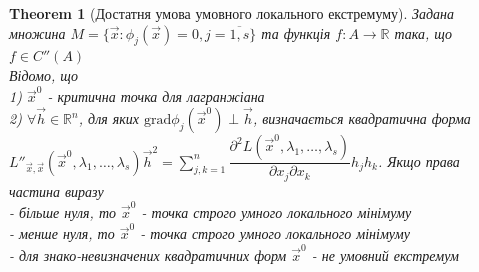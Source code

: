 \documentclass[a4paper, 10pt]{article}
\def\huge{\displaystyle}
\theoremstyle{theoremdd}
\newtheorem{theorem}{Theorem}[subsection]
\theoremstyle{theoremdd}
\theoremstyle{theoremdd}
\theoremstyle{theoremdd}
\theoremstyle{theoremdd}
\theoremstyle{theoremdd}
\theoremstyle{theoremdd}
\theoremstyle{theoremdd}
\begin{document}
\begin{theorem}[Достатня умова умовного локального екстремуму]
Задана множина $M=\{\vec{x}: \phi_j(\vec{x}) =0, j = \overline{1,s} \}$ та функція $f: A \to \mathbb{R}$ така, що $f \in C''(A)$\\
Відомо, що \\
1) $\vec{x}^0$ - критична точка для лагранжіана\\
2) $\forall \vec{h} \in \mathbb{R}^n$, для яких $\textrm{grad} \phi_j(\vec{x}^0) \perp \vec{h}$, визначається квадратична форма\\
$L''_{\vec{x},\vec{x}}(\vec{x}^0, \lambda_1, \dots, \lambda_s) \vec{h}^2 = \huge \sum_{j,k=1}^n \dfrac{\partial^2 L(\vec{x}^0, \lambda_1, \dots, \lambda_s)}{\partial x_j \partial x_k} h_j h_k$. Якщо права частина виразу\\
- більше нуля, то $\vec{x}^0$ - точка строго умного локального мінімуму\\
- менше нуля, то $\vec{x}^0$ - точка строго умного локального мінімуму\\
- для знако-невизначених квадратичних форм $\vec{x}^0$ - не умовний екстремум
\end{theorem}
\end{document}

